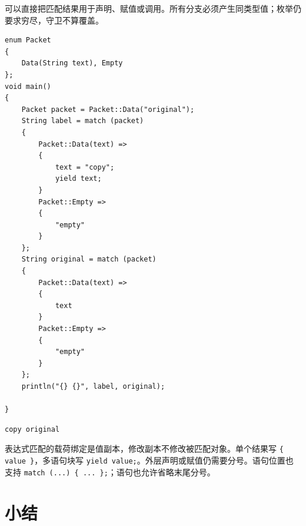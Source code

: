 可以直接把匹配结果用于声明、赋值或调用。所有分支必须产生同类型值；枚举仍要求穷尽，守卫不算覆盖。

\par
\medskip
\begin{lstlisting}[style=chali]
enum Packet
{
    Data(String text), Empty
};
void main()
{
    Packet packet = Packet::Data("original");
    String label = match (packet)
    {
        Packet::Data(text) =>
        {
            text = "copy";
            yield text;
        }
        Packet::Empty =>
        {
            "empty"
        }
    };
    String original = match (packet)
    {
        Packet::Data(text) =>
        {
            text
        }
        Packet::Empty =>
        {
            "empty"
        }
    };
    println("{} {}", label, original);

}
\end{lstlisting}
\par
\medskip

\par
\medskip
\begin{lstlisting}[style=out]
copy original
\end{lstlisting}
\par
\medskip

表达式匹配的载荷绑定是值副本，修改副本不修改被匹配对象。单个结果写 \texttt{\{ value \}}，多语句块写 \texttt{yield value;}。外层声明或赋值仍需要分号。语句位置也支持 \texttt{match (\allowbreak{}.\allowbreak{}.\allowbreak{}.\allowbreak{})\allowbreak{} \{ .\allowbreak{}.\allowbreak{}.\allowbreak{} \};}；语句也允许省略末尾分号。

\section{小结}

